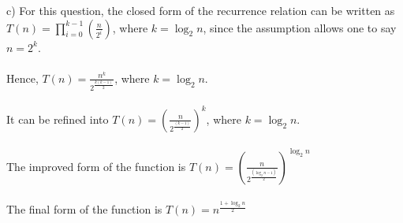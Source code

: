 \documentclass[12pt]{article}
\begin{document}
  c) For this question, the closed form of the recurrence relation can be written as $T(n) = \prod_{i=0}^{k-1}(\frac{n}{2^{i}})$, where $k=\log_{2}{n}$, since the assumption allows one to say $n=2^{k}$. \\\\
  Hence, $T(n) = \frac{n^{k}}{2^{\frac{k(k-1)}{2}}}$, where $k = \log_{2}n$. \\\\
  It can be refined into $T(n) = (\frac{n}{2^{\frac{(k-1)}{2}}})^{k}$, where $k = \log_{2}n$. \\\\
  The improved form of the function is $T(n) = (\frac{n}{2^{\frac{(\log_{2}n-1)}{2}}})^{\log_{2}n}$ \\\\
  The final form of the function is $T(n) = n^{\frac{1+\log_{2}n}{2}}$
\end{document}
